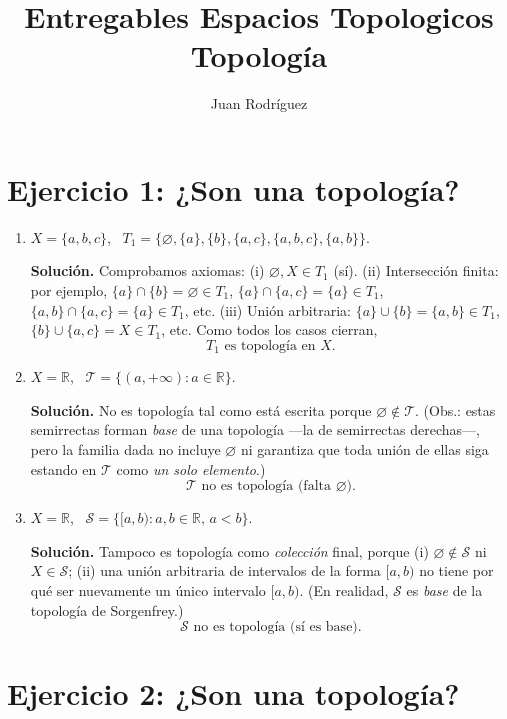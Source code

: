 \documentclass[12pt]{article}
\title{Entregables Espacios Topologicos Topología}
\author{Juan Rodríguez}
\date{}
\begin{document}
\maketitle
\section*{Ejercicio 1: ¿Son una topología?}

\begin{enumerate}
\item $X=\{a,b,c\}$, \ 
$T_1=\{\varnothing,\{a\},\{b\},\{a,c\},\{a,b,c\},\{a,b\}\}$.

\textbf{Solución.} 
Comprobamos axiomas:
(i) $\varnothing,X\in T_1$ (sí).
(ii) Intersección finita: por ejemplo,
$\{a\}\cap\{b\}=\varnothing\in T_1$,
$\{a\}\cap\{a,c\}=\{a\}\in T_1$,
$\{a,b\}\cap\{a,c\}=\{a\}\in T_1$, etc.
(iii) Unión arbitraria: 
$\{a\}\cup\{b\}=\{a,b\}\in T_1$,
$\{b\}\cup\{a,c\}=X\in T_1$, etc.
Como todos los casos cierran, 
\[
\boxed{T_1\text{ es topología en }X.}
\]

\item $X=\mathbb{R}$, \ 
$\mathcal{T}=\{(a,+\infty):a\in\mathbb{R}\}$.

\textbf{Solución.}
No es topología tal como está escrita porque 
\(\varnothing\notin\mathcal{T}\).
(Obs.: estas semirrectas forman \emph{base} de una topología —la de semirrectas derechas—,
pero la familia dada no incluye \(\varnothing\) ni garantiza que toda unión de ellas
siga estando en \(\mathcal{T}\) como \emph{un solo elemento}.) 
\[
\boxed{\mathcal{T}\text{ no es topología (falta } \varnothing).}
\]

\item $X=\mathbb{R}$, \ 
$\mathcal{S}=\{[a,b):a,b\in\mathbb{R},\,a<b\}$.

\textbf{Solución.}
Tampoco es topología como \emph{colección} final, porque (i) 
\(\varnothing\notin\mathcal{S}\) ni \(X\in\mathcal{S}\); 
(ii) una unión arbitraria de intervalos de la forma $[a,b)$ 
no tiene por qué ser nuevamente un único intervalo $[a,b)$.
(En realidad, $\mathcal{S}$ es \emph{base} de la topología de Sorgenfrey.) 
\[
\boxed{\mathcal{S}\text{ no es topología (sí es base).}}
\]
\end{enumerate}

\section*{Ejercicio 2: ¿Son una topología?}
\end{document}
